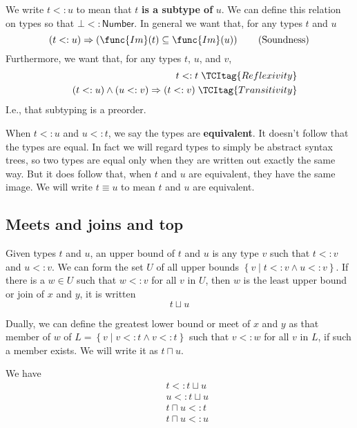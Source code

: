 \documentclass[12pt]{article}
\begin{document}
We write $t<:u$ to mean that $t$ \textbf{is a subtype of} $u$. We can define
this relation on types so that $\bot <:\mathsf{Number}$. In general we want
that, for any types $t$ and $u$%
\begin{equation}
\left( t<:u\right) \Rightarrow \left( \func{Im}(t)\subseteq \func{Im}%
(u)\right)   \tag{Soundness}
\end{equation}%
Furthermore, we want that, for any types $t$, $u$, and $v$,%
\begin{eqnarray}
&&\left. t<:t\right.   \TCItag{Reflexivity} \\
&&\left. \left( t<:u\right) \wedge \left( u<:v\right) \Rightarrow \left(
t<:v\right) \right.   \TCItag{Transitivity}
\end{eqnarray}%
I.e., that subtyping is a preorder.

When $t<:u$ and $u<:t$, we say the types are \textbf{equivalent}. It doesn't
follow that the types are equal. In fact we will regard types to simply be
abstract syntax trees, so two types are equal only when they are written out
exactly the same way. But it does follow that, when $t$ and $u$ are
equivalent, they have the same image. We will write $t\equiv u$ to mean $t$
and $u$ are equivalent.

\subsection{Meets and joins and top}

Given types $t$ and $u$, an upper bound of $t$ and $u$ is any type $v$ such
that $t<:v$ and $u<:v$. We can form the set $U$ of all upper bounds $\left\{
v\mid t<:v\wedge u<:v\right\} $. If there is a $w\in U$ such that $w<:v$ for
all $v$ in $U$, then $w$ is the least upper bound or join of $x$ and $y$, it
is written%
\begin{equation*}
t\sqcup u
\end{equation*}

Dually, we can define the greatest lower bound or meet of $x$ and $y$ as
that member of $w$ of $L=\left\{ v\mid v<:t\wedge v<:t\right\} $ such that $%
v<:w$ for all $v$ in $L$, if such a member exists. We will write it as $%
t\sqcap u$.

We have%
\begin{eqnarray*}
&&t<:t\sqcup u \\
&&u<:t\sqcup u \\
&&t\sqcap u<:t \\
&&t\sqcap u<:u
\end{eqnarray*}
\end{document}
